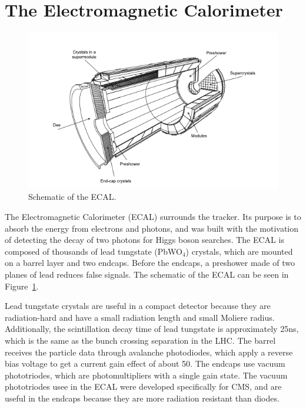 \vspace{-3pt}
\section{The Electromagnetic Calorimeter}\label{sec:ch3:ecal}

\begin{figure}[h]
\centering
\includegraphics[width=1.0\textwidth]{figures/ecal_replace.png}
\caption{Schematic of the ECAL.}
\label{fig:ECAL}
\end{figure}


The Electromagnetic Calorimeter (ECAL) surrounds the tracker. Its purpose is to absorb the energy from electrons and photons, and was built with the motivation of detecting the decay of two photons for Higgs boson searches. The ECAL is composed of thousands of lead tungstate (PbWO$_4$) crystals, which are mounted on a barrel layer and two endcaps. Before the endcaps, a preshower made of two planes of lead reduces false signals. The schematic of the ECAL can be seen in Figure~\ref{fig:ECAL}.

Lead tungstate crystals are useful in a compact detector because they are radiation-hard and have a small radiation length and small Moliere radius. Additionally, the scintillation decay time of lead tungstate is approximately 25ns, which is the same as the bunch crossing separation in the LHC. The barrel receives the particle data through avalanche photodiodes, which apply a reverse bias voltage to get a current gain effect of about 50. The endcaps use vacuum phototriodes, which are photomultipliers with a single gain state. The vacuum phototriodes usee in the ECAL were developed specifically for CMS, and are useful in the endcaps because they are more radiation resistant than diodes.

